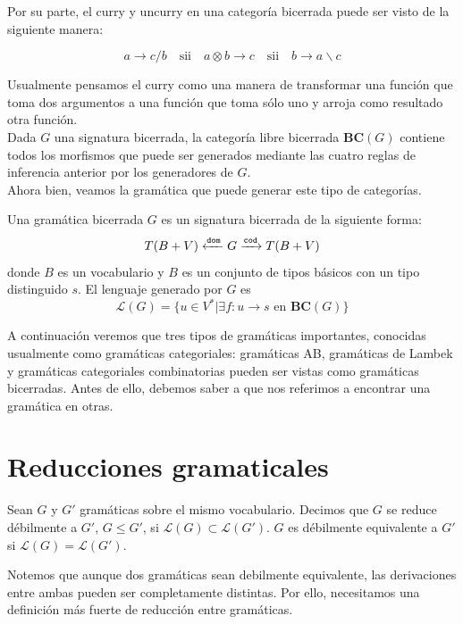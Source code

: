 \documentclass[../main.tex]{subfiles}
\begin{document}
	Por su parte, el curry y uncurry en una categoría bicerrada puede ser visto de la siguiente manera:
	
	$$a \to c/b \quad \text{sii} \quad a \otimes b \to c \quad \text{sii} \quad b \to a \backslash c$$
	
	Usualmente pensamos el curry como una manera de transformar una función que toma dos argumentos a una función que toma sólo uno y arroja como resultado otra función.\\
	
	Dada $G$ una signatura bicerrada, la categoría libre bicerrada \textbf{BC}$(G)$ contiene todos los morfismos que puede ser generados mediante las cuatro reglas de inferencia anterior por los generadores de $G$. \\
	
	Ahora bien, veamos la gramática que puede generar este tipo de categorías. 
	
	\begin{dfn}
		Una gramática bicerrada $G$ es un signatura bicerrada de la siguiente forma:
			$$T(B+V) \xleftarrow{\tt{dom}} G \xrightarrow{\tt{cod}} T(B+V)$$
		donde $B$ es un vocabulario y $B$ es un conjunto de tipos básicos con un tipo distinguido $s$. El lenguaje generado por $G$ es
		\[
			\mathcal{L}(G)= \{ u \in V^* | \exists f:u \to s \text{ en } \textbf{BC}(G) \}
		\]
	\end{dfn}
	
	A continuación veremos que tres tipos de gramáticas importantes, conocidas usualmente como gramáticas categoriales: gramáticas AB, gramáticas de Lambek y gramáticas categoriales combinatorias pueden ser vistas como gramáticas bicerradas. Antes de ello, debemos saber a que nos referimos a encontrar una gramática en otras.
	
	\section{Reducciones gramaticales}
	
	\begin{dfn}
		Sean $G$ y $G'$ gramáticas sobre el mismo vocabulario. Decimos que $G$ se reduce débilmente a $G'$, $G \leq G'$, si $\mathcal{L}(G) \subset \mathcal{L}(G')$. $G$ es débilmente equivalente a $G'$ si $\mathcal{L}(G) = \mathcal{L}(G')$. 
	\end{dfn}
	
	Notemos que aunque dos gramáticas sean debilmente equivalente, las derivaciones entre ambas pueden ser completamente distintas. Por ello, necesitamos una definición más fuerte de reducción entre gramáticas.
	
\end{document}
